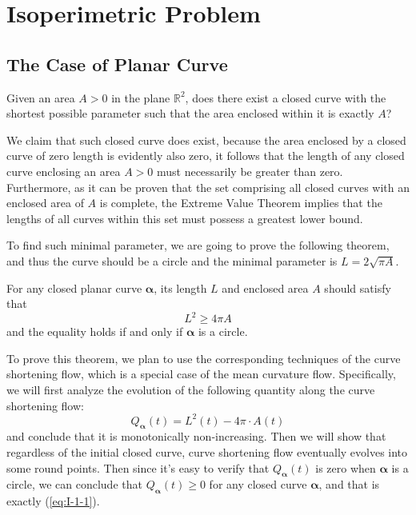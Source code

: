 \section{Isoperimetric Problem}

\subsection{The Case of Planar Curve}
\begin{problem}\label{prob:I-1-1}
    Given an area $A>0$ in the plane $\mathbb{R}^2$, does there exist a closed curve with the shortest possible parameter such that the area enclosed within it is exactly $A$?
\end{problem}

We claim that such closed curve does exist, because the area enclosed by a closed curve of zero length is evidently also zero, it follows that the length of any closed curve enclosing an area $A>0$ must necessarily be greater than zero. Furthermore, as it can be proven that the set comprising all closed curves with an enclosed area of $A$ is complete, the Extreme Value Theorem implies that the lengths of all curves within this set must possess a greatest lower bound.

To find such minimal parameter, we are going to prove the following theorem, and thus the curve should be a circle and the minimal parameter is $L=2\sqrt{\pi A}$.

\begin{theorem}\label{thm:P-Isoperimetric Inequality}
    For any closed planar curve $\boldsymbol{\alpha}$, its length $L$ and enclosed area $A$ should satisfy that
\begin{equation}\label{eq:I-1-1}
    L^2\ge 4\pi A
\end{equation}
and the equality holds if and only if $\boldsymbol{\alpha}$ is a circle.
\end{theorem}

To prove this theorem, we plan to use the corresponding techniques of the curve shortening flow, which is a special case of the mean curvature flow. Specifically, we will first analyze the evolution of the following quantity along the curve shortening flow:
\begin{equation*}
    Q_{\boldsymbol{\alpha}}(t)=L^2(t)-4\pi\cdot A(t)
\end{equation*}
and conclude that it is monotonically non-increasing. Then we will show that regardless of the initial closed curve, curve shortening flow eventually evolves into some round points. Then since it's easy to verify that $Q_{\boldsymbol{\alpha}}(t)$ is zero when $\boldsymbol{\alpha}$ is a circle, we can conclude that $Q_{\boldsymbol{\alpha}}(t)\ge 0$ for any closed curve $\boldsymbol{\alpha}$, and that is exactly (\ref{eq:I-1-1}).

